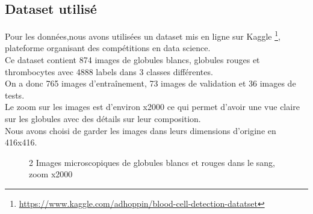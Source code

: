 \label{part1}

\subsection{Dataset utilisé}

Pour les données,nous avons utilisées un dataset mis en ligne sur Kaggle \footnote{\url{https://www.kaggle.com/adhoppin/blood-cell-detection-datatset}}, plateforme organisant des compétitions en data science.\\
Ce dataset contient 874 images de globules blancs, globules rouges et thrombocytes avec 4888 labels dans 3 classes différentes.\\
On a donc 765 images d'entraînement, 73 images de validation et 36 images de tests.\\
Le zoom sur les images est d'environ x2000 ce qui permet d'avoir une vue claire sur les globules avec des détails sur leur composition.\\
Nous avons choisi de garder les images dans leurs dimensions d'origine en 416x416.\\

\begin{figure}
    \centering
    \qquad
    \caption{2 Images microscopiques de globules blancs et rouges dans le sang, zoom x2000}
    \label{fig:example}
\end{figure}


